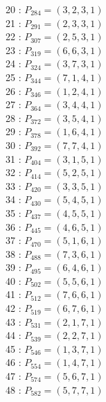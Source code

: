 \documentclass{article}
\begin{document}
{\begin{multicols}{2}
20 : $P_{284}=( 3, 2, 3, 1 )$\\
21 : $P_{291}=( 2, 3, 3, 1 )$\\
22 : $P_{307}=( 2, 5, 3, 1 )$\\
23 : $P_{319}=( 6, 6, 3, 1 )$\\
24 : $P_{324}=( 3, 7, 3, 1 )$\\
25 : $P_{344}=( 7, 1, 4, 1 )$\\
26 : $P_{346}=( 1, 2, 4, 1 )$\\
27 : $P_{364}=( 3, 4, 4, 1 )$\\
28 : $P_{372}=( 3, 5, 4, 1 )$\\
29 : $P_{378}=( 1, 6, 4, 1 )$\\
30 : $P_{392}=( 7, 7, 4, 1 )$\\
31 : $P_{404}=( 3, 1, 5, 1 )$\\
32 : $P_{414}=( 5, 2, 5, 1 )$\\
33 : $P_{420}=( 3, 3, 5, 1 )$\\
34 : $P_{430}=( 5, 4, 5, 1 )$\\
35 : $P_{437}=( 4, 5, 5, 1 )$\\
36 : $P_{445}=( 4, 6, 5, 1 )$\\
37 : $P_{470}=( 5, 1, 6, 1 )$\\
38 : $P_{488}=( 7, 3, 6, 1 )$\\
39 : $P_{495}=( 6, 4, 6, 1 )$\\
40 : $P_{502}=( 5, 5, 6, 1 )$\\
41 : $P_{512}=( 7, 6, 6, 1 )$\\
42 : $P_{519}=( 6, 7, 6, 1 )$\\
43 : $P_{531}=( 2, 1, 7, 1 )$\\
44 : $P_{539}=( 2, 2, 7, 1 )$\\
45 : $P_{546}=( 1, 3, 7, 1 )$\\
46 : $P_{554}=( 1, 4, 7, 1 )$\\
47 : $P_{574}=( 5, 6, 7, 1 )$\\
48 : $P_{582}=( 5, 7, 7, 1 )$\\
\end{multicols}
}
\end{document}
